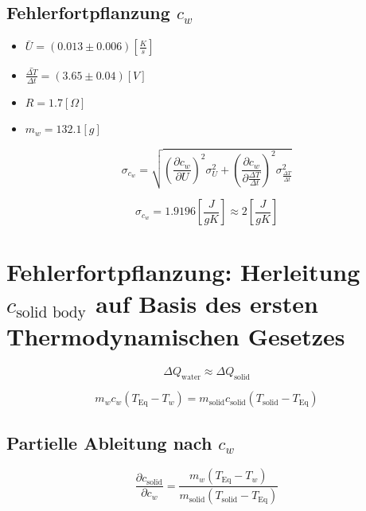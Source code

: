 \documentclass[10pt,a4paper]{article}
\begin{document}
\subsection{Fehlerfortpflanzung $c_w$}

\begin{itemize}
    \item $\bar{U} = \left( 0.013 \pm 0.006 \right) \left[\frac{K}{s}\right]$
    \item $\bar{\frac{\Delta T}{\Delta t}} = \left( 3.65 \pm 0.04 \right) \left[ V  \right]$
    \item $R = 1.7 \left[ \Omega \right]$
    \item $m_w = 132.1 \left[ g \right]$
\end{itemize}

\begin{equation}
    \sigma_{c_w} = \sqrt{ \left(\frac{\partial c_w}{\partial U}\right)^2 \sigma_U^2 + \left(\frac{\partial c_w}{\partial \frac{\Delta T}{\Delta t}} \right)^2 \sigma_{\frac{\Delta T}{\Delta t}}^2} 
\end{equation}

\begin{equation}
    \sigma_{c_w} = 1.9196 \left[\frac{J}{g K}\right] \approx 2 \left[\frac{J}{g K}\right]
\end{equation}

\centerline{}


\section{Fehlerfortpflanzung: Herleitung $c_{\text{solid body}}$ auf Basis des ersten Thermodynamischen Gesetzes}

\begin{equation}
    \Delta Q_{\text{water}} \approx  \Delta Q_{\text{solid}}
\end{equation}

\begin{equation}
    m_w c_w (T_{\text{Eq}} - T_w) = m_{\text{solid}} c_{\text{solid}} (T_{\text{solid}} - T_{\text{Eq}})
\end{equation}

\subsection{Partielle Ableitung nach $c_w$}

\begin{equation}
    \frac{\partial c_{\text{solid}}}{\partial c_w} = \frac{m_w (T_{\text{Eq}} - T_w)}{m_{\text{solid}} (T_{\text{solid}} - T_{\text{Eq}})
}
\end{equation}
\end{document}
